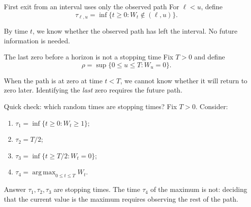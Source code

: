 \documentclass[10pt,aspectratio=169]{beamer}
\begin{document}
\begin{frame}{First exit from an interval uses only the observed path}
For \(\ell<u\), define
\[
\tau_{\ell,u}=\inf\{t\ge0:W_t\notin(\ell,u)\}.
\]
\begin{center}
\end{center}
By time \(t\), we know whether the observed path has left the interval. No future information is needed.
\end{frame}

\begin{frame}{The last zero before a horizon is not a stopping time}
Fix \(T>0\) and define
\[
\rho=\sup\{0\le u\le T:W_u=0\}.
\]
\begin{center}
\end{center}
When the path is at zero at time \(t<T\), we cannot know whether it will return to zero later. Identifying the \emph{last} zero requires the future path.
\end{frame}

\begin{frame}{Quick check: which random times are stopping times?}
Fix \(T>0\). Consider:
\begin{enumerate}\setlength{\itemsep}{0.55em}
  \item \(\tau_1=\inf\{t\ge0:W_t\ge1\}\);
  \item \(\tau_2=T/2\);
  \item \(\tau_3=\inf\{t\ge T/2:W_t=0\}\);
  \item \(\tau_4=\operatorname*{arg\,max}_{0\le t\le T}W_t\).
\end{enumerate}
\pause
\begin{block}{Answer}
\(\tau_1,\tau_2,\tau_3\) are stopping times. The time \(\tau_4\) of the maximum is not: deciding that the current value is the maximum requires observing the rest of the path.
\end{block}
\end{frame}
\end{document}
